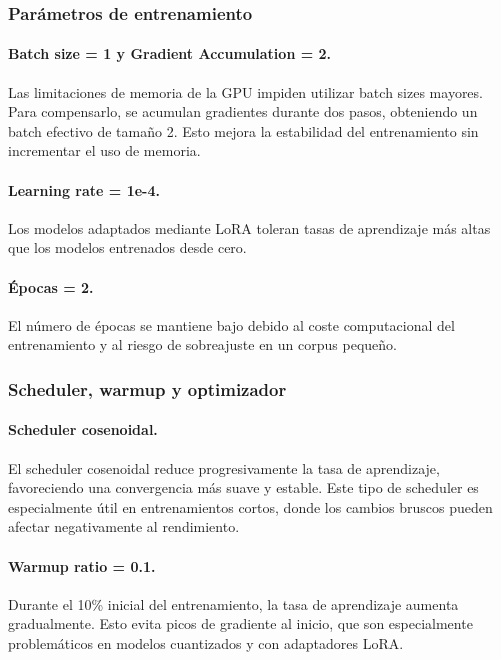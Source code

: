 \subsubsection{Parámetros de entrenamiento}

\paragraph{Batch size = 1 y Gradient Accumulation = 2.}
Las limitaciones de memoria de la GPU impiden utilizar batch sizes mayores. Para compensarlo, se acumulan gradientes durante dos pasos, obteniendo un batch efectivo de tamaño 2. Esto mejora la estabilidad del entrenamiento sin incrementar el uso de memoria.

\paragraph{Learning rate = 1e-4.}
Los modelos adaptados mediante LoRA toleran tasas de aprendizaje más altas que los modelos entrenados desde cero. 

\paragraph{Épocas = 2.}
El número de épocas se mantiene bajo debido al coste computacional del entrenamiento y al riesgo de sobreajuste en un corpus pequeño.

\subsubsection{Scheduler, warmup y optimizador}

\paragraph{Scheduler cosenoidal.}
El scheduler cosenoidal reduce progresivamente la tasa de aprendizaje, favoreciendo una convergencia más suave y estable. Este tipo de scheduler es especialmente útil en entrenamientos cortos, donde los cambios bruscos pueden afectar negativamente al rendimiento.

\paragraph{Warmup ratio = 0.1.}
Durante el 10\% inicial del entrenamiento, la tasa de aprendizaje aumenta gradualmente. Esto evita picos de gradiente al inicio, que son especialmente problemáticos en modelos cuantizados y con adaptadores LoRA.

